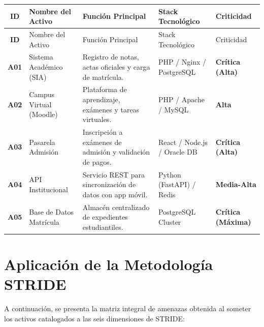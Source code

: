 \begin{center}
\small
\begin{longtable}{>{\bfseries}c p{3.2cm} p{3.6cm} p{2.5cm} p{2.8cm}}
\toprule
\rowcolor{outermarginbgcolor}
ID & Nombre del Activo & Función Principal & Stack Tecnológico & Criticidad \\
\midrule
\endfirsthead
\toprule
\rowcolor{outermarginbgcolor}
ID & Nombre del Activo & Función Principal & Stack Tecnológico & Criticidad \\
\midrule
\endhead
\bottomrule
\endfoot
A01 & Sistema Académico (SIA) & Registro de notas, actas oficiales y carga de matrícula. & PHP / Nginx / PostgreSQL & \textbf{Crítica (Alta)} \\
\midrule
A02 & Campus Virtual (Moodle) & Plataforma de aprendizaje, exámenes y tareas virtuales. & PHP / Apache / MySQL & \textbf{Alta} \\
\midrule
A03 & Pasarela Admisión & Inscripción a exámenes de admisión y validación de pagos. & React / Node.js / Oracle DB & \textbf{Crítica (Alta)} \\
\midrule
A04 & API Institucional & Servicio REST para sincronización de datos con app móvil. & Python (FastAPI) / Redis & \textbf{Media-Alta} \\
\midrule
A05 & Base de Datos Matrícula & Almacén centralizado de expedientes estudiantiles. & PostgreSQL Cluster & \textbf{Crítica (Máxima)} \\
\bottomrule
\end{longtable}
\end{center}

\section{Aplicación de la Metodología STRIDE}
A continuación, se presenta la matriz integral de amenazas obtenida al someter los activos catalogados a las seis dimensiones de STRIDE:

